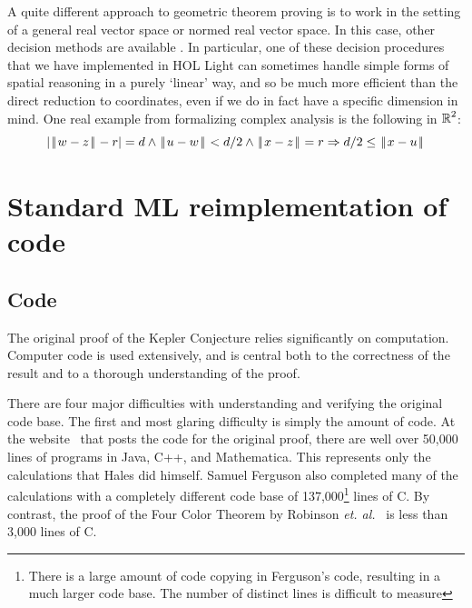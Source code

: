 \documentclass[11pt]{amsart}
\def\|{{\hskip0.1em|\hskip-0.15em|\hskip0.1em}}
\newcommand{\real}{\mbox{$\protect\mathbb R$}}
\let\And=\wedge                    %
\newcommand{\Imp}{\Rightarrow}
\begin{document}
A quite different approach to geometric theorem proving is to work in the
setting of a general real vector space or normed real vector space. In this
case, other decision methods are available \cite{solovay-jointpaper}. In
particular, one of these decision procedures that we have implemented in HOL
Light can sometimes handle simple forms of spatial reasoning in a purely
`linear' way, and so be much more efficient than the direct reduction to
coordinates, even if we do in fact have a specific dimension in mind. One
real example from formalizing complex analysis is the following in $\real^2$:
$$ |\|w - z\| - r| = d \And \|u - w\| < d/2 \And \|x - z\| = r
   \Imp d/2 \leq \|x - u\|
$$




\section{Standard ML reimplementation of code}
\label{sec:code}

\subsection*{Code}




The original proof of the Kepler
Conjecture relies significantly
on computation. Computer code is used extensively, and is
central both to the correctness of the result and to a thorough
understanding of the proof. 

  There are four major difficulties with understanding and verifying
the original code base. The first and most glaring difficulty is
simply the amount of code. At the website~\cite{website:Hales:1998:Code}
that posts the code for the original proof,
there are well over 50,000 lines of programs in Java, C++, and
Mathematica. This represents only the calculations that Hales did himself.
Samuel Ferguson also completed many of the calculations with a completely
different code base of 137,000\footnote{There is a large amount of
code copying in Ferguson's code, resulting in a much larger code base.
The number of distinct lines is difficult to measure} lines of C. By
contrast, the proof of the Four Color Theorem by Robinson \textit{et.
al.}~\cite{Robertson:1997:JCTB} is less than 3,000 lines of C.
\end{document}
